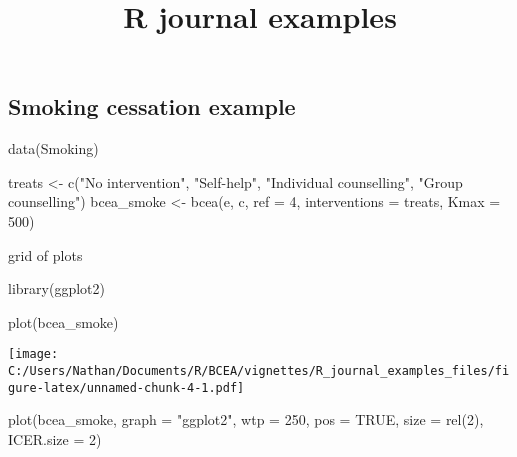 \documentclass[
]{article}
\title{R journal examples}
\author{}
\date{\vspace{-2.5em}}
\newenvironment{Shaded}{\begin{snugshade}}{\end{snugshade}}
\newcommand{\AttributeTok}[1]{\textcolor[rgb]{0.77,0.63,0.00}{#1}}
\newcommand{\ConstantTok}[1]{\textcolor[rgb]{0.00,0.00,0.00}{#1}}
\newcommand{\DecValTok}[1]{\textcolor[rgb]{0.00,0.00,0.81}{#1}}
\newcommand{\FunctionTok}[1]{\textcolor[rgb]{0.00,0.00,0.00}{#1}}
\newcommand{\NormalTok}[1]{#1}
\newcommand{\OtherTok}[1]{\textcolor[rgb]{0.56,0.35,0.01}{#1}}
\newcommand{\StringTok}[1]{\textcolor[rgb]{0.31,0.60,0.02}{#1}}
\begin{document}
\maketitle

\hypertarget{smoking-cessation-example}{%
\subsection{Smoking cessation example}\label{smoking-cessation-example}}

\begin{Shaded}
\begin{Highlighting}[]
\FunctionTok{data}\NormalTok{(Smoking)}

\NormalTok{treats }\OtherTok{\textless{}{-}} \FunctionTok{c}\NormalTok{(}\StringTok{"No intervention"}\NormalTok{, }\StringTok{"Self{-}help"}\NormalTok{, }\StringTok{"Individual counselling"}\NormalTok{, }\StringTok{"Group counselling"}\NormalTok{)}
\NormalTok{bcea\_smoke }\OtherTok{\textless{}{-}} \FunctionTok{bcea}\NormalTok{(e, c, }\AttributeTok{ref =} \DecValTok{4}\NormalTok{, }\AttributeTok{interventions =}\NormalTok{ treats, }\AttributeTok{Kmax =} \DecValTok{500}\NormalTok{)}
\end{Highlighting}
\end{Shaded}

grid of plots

\begin{Shaded}
\begin{Highlighting}[]
\FunctionTok{library}\NormalTok{(ggplot2)}

\FunctionTok{plot}\NormalTok{(bcea\_smoke)}
\end{Highlighting}
\end{Shaded}

\texttt{[image: C:/Users/Nathan/Documents/R/BCEA/vignettes/R\_journal\_examples\_files/figure-latex/unnamed-chunk-4-1.pdf]}

\begin{Shaded}
\begin{Highlighting}[]

\FunctionTok{plot}\NormalTok{(bcea\_smoke, }\AttributeTok{graph =} \StringTok{"ggplot2"}\NormalTok{, }\AttributeTok{wtp =} \DecValTok{250}\NormalTok{, }\AttributeTok{pos =} \ConstantTok{TRUE}\NormalTok{, }\AttributeTok{size =} \FunctionTok{rel}\NormalTok{(}\DecValTok{2}\NormalTok{), }\AttributeTok{ICER.size =} \DecValTok{2}\NormalTok{)}
\end{Highlighting}
\end{Shaded}
\end{document}
